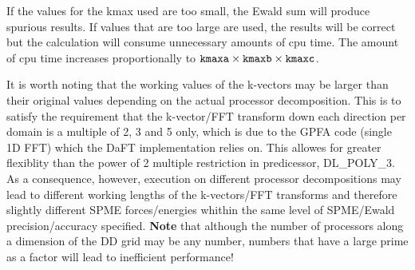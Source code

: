 If the values for the kmax used are too small, the Ewald sum will
produce spurious results.  If values that are too large are used,
the results will be correct but the calculation will consume unnecessary
amounts of cpu time. The amount of cpu time increases proportionally
to ${\tt kmaxa}  \times {\tt kmaxb} \times {\tt kmaxc}$.

It is worth noting that the working values of the k-vectors may be larger
than their original values depending on the actual processor decomposition.
This is to satisfy the requirement that the k-vector/FFT transform down
each direction per domain is a multiple of 2, 3 and 5 only, which is due
to the GPFA code (single 1D FFT) which the DaFT implementation relies on.
This allowes for greater flexiblity than the power of 2 multiple
restriction in \D predicessor, DL\_POLY\_3.  As a consequence, however,
execution on different processor decompositions may lead to different
working lengths of the k-vectors/FFT transforms and therefore slightly
different SPME forces/energies whithin the same level of SPME/Ewald
precision/accuracy specified.  {\bf Note} that although the number of
processors along a dimension of the DD grid may be any number, numbers
that have a large prime as a factor will lead to inefficient performance!
